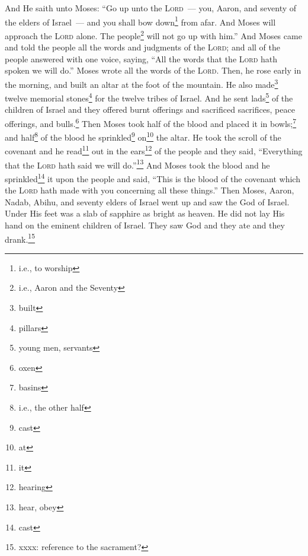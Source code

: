 
\begin{inparaenum}
     And He saith unto Moses: ``Go up unto the \textsc{Lord}~--- you, Aaron, and seventy of the elders of Israel~--- and you shall bow down\footnote{i.e., to worship} from afar.%
     And Moses will approach the \textsc{Lord} alone. The people\footnote{i.e., Aaron and the Seventy} will not go up with him.''%
     And Moses came and told the people all the words and judgments of the \textsc{Lord}; and all of the people answered with one voice, saying, ``All the words that the \textsc{Lord} hath spoken we will do.''%
     Moses wrote all the words of the \textsc{Lord}. Then, he rose early in the morning, and built an altar at the foot of the mountain. He also made\footnote{built} twelve memorial stones\footnote{pillars} for the twelve tribes of Israel.%
     And he sent lads\footnote{young men, servants} of the children of Israel and they offered burnt offerings and sacrificed sacrifices, peace offerings, and bulls.\footnote{oxen}%
     Then Moses took half of the blood and placed it in bowls;\footnote{basins} and half\footnote{i.e., the other half} of the blood he sprinkled\footnote{cast} on\footnote{at} the altar.%
     He took the scroll of the covenant and he read\footnote{it} out in the ears\footnote{hearing} of the people and they said, ``Everything that the \textsc{Lord} hath said we will do.''\footnote{hear, obey}%
     And Moses took the blood and he sprinkled\footnote{cast} it upon the people and said, ``This is the blood of the covenant which the \textsc{Lord} hath made with you concerning all these things.''%
     Then Moses, Aaron, Nadab, Abihu, and seventy elders of Israel went up%
     and saw the God of Israel. Under His feet was a slab of sapphire as bright as heaven.%
     He did not lay His hand on the eminent children of Israel. They saw God and they ate and they drank.\footnote{xxxx: reference to the sacrament?}%
    

\end{inparaenum}
